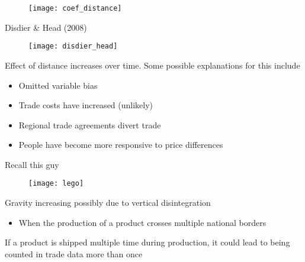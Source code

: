 \documentclass{beamer}
\begin{document}
\begin{frame}
  \begin{figure}
    \texttt{[image: coef\_distance]}
  \end{figure}
\end{frame}

\begin{frame}{Disdier \& Head (2008)}
  \begin{figure}
    \texttt{[image: disdier\_head]}
  \end{figure}
\end{frame}

\begin{frame}
  Effect of distance increases over time.
  Some possible explanations for this include
  \medskip
  \begin{itemize}
    \item Omitted variable bias 
    \item Trade costs have increased (unlikely)
    \item Regional trade agreements divert trade 
    \item People have become more responsive to price differences
  \end{itemize}
\end{frame}

\begin{frame}{Recall this guy}
  \begin{figure}\centering
    \texttt{[image: lego]}
  \end{figure}
\end{frame}

\begin{frame}
  Gravity increasing possibly due to vertical disintegration
  \begin{itemize}
    \item When the production of a product crosses multiple national borders
  \end{itemize}
  If a product is shipped multiple time during production, it could lead to being counted in trade data more than once
\end{frame}
\end{document}
